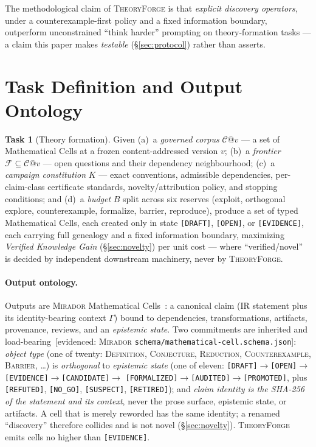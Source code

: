 \documentclass[11pt]{amsart}
\theoremstyle{definition}
\newtheorem{task}{Task}
\theoremstyle{remark}
\newcommand{\mirador}{\textsc{Mirador}}
\newcommand{\tf}{\textsc{TheoryForge}}
\newcommand{\state}[1]{\texttt{[#1]}}
\newcommand{\otype}[1]{\textsc{#1}}
\newcommand{\ev}[1]{\textsf{\footnotesize[#1]}} %
\begin{document}
The methodological claim of \tf{} is that \emph{explicit discovery operators},
under a counterexample-first policy and a fixed information boundary, outperform
unconstrained ``think harder'' prompting on theory-formation tasks --- a claim
this paper makes \emph{testable} (\S\ref{sec:protocol}) rather than asserts.

\section{Task Definition and Output Ontology}\label{sec:task}

\begin{task}[Theory formation]\label{task:tf}
Given
(a)~a \emph{governed corpus} $\mathcal{C}@v$ --- a set of Mathematical Cells at a
frozen content-addressed version $v$;
(b)~a \emph{frontier} $\mathcal{F}\subseteq\mathcal{C}@v$ --- open questions and
their dependency neighbourhood;
(c)~a \emph{campaign constitution} $K$ --- exact conventions, admissible
dependencies, per-claim-class certificate standards, novelty/attribution policy,
and stopping conditions; and
(d)~a \emph{budget} $B$ split across six reserves (exploit, orthogonal explore,
counterexample, formalize, barrier, reproduce),
produce a set of typed Mathematical Cells, each created only in state
\state{DRAFT}, \state{OPEN}, or \state{EVIDENCE}, each carrying full genealogy
and a fixed information boundary, maximizing \emph{Verified Knowledge Gain}
(\S\ref{sec:novelty}) per unit cost --- where ``verified/novel'' is decided by
independent downstream machinery, never by \tf{}.
\end{task}

\paragraph{Output ontology.} Outputs are \mirador{} Mathematical
Cells~\cite{lucius2026mirador}: a canonical claim (IR statement plus its
identity-bearing context $\Gamma$) bound to dependencies, transformations,
artifacts, provenance, reviews, and an \emph{epistemic state}. Two commitments
are inherited and load-bearing~\ev{evidenced: \mirador{}
\texttt{schema/mathematical-cell.schema.json}}:
\emph{object type} (one of twenty: \otype{Definition}, \otype{Conjecture},
\otype{Reduction}, \otype{Counterexample}, \otype{Barrier}, \ldots) is
\emph{orthogonal} to \emph{epistemic state} (one of eleven:
\state{DRAFT}$\to$\state{OPEN}$\to$\state{EVIDENCE}$\to$\state{CANDIDATE}$\to$%
\state{FORMALIZED}$\to$\state{AUDITED}$\to$\state{PROMOTED}, plus
\state{REFUTED}, \state{NO\_GO}, \state{SUSPECT}, \state{RETIRED}); and
\emph{claim identity is the SHA-256 of the statement and its context}, never the
prose surface, epistemic state, or artifacts. A cell that is merely reworded has
the same identity; a renamed ``discovery'' therefore collides and is not novel
(\S\ref{sec:novelty}). \tf{} emits cells no higher than \state{EVIDENCE}.
\end{document}
